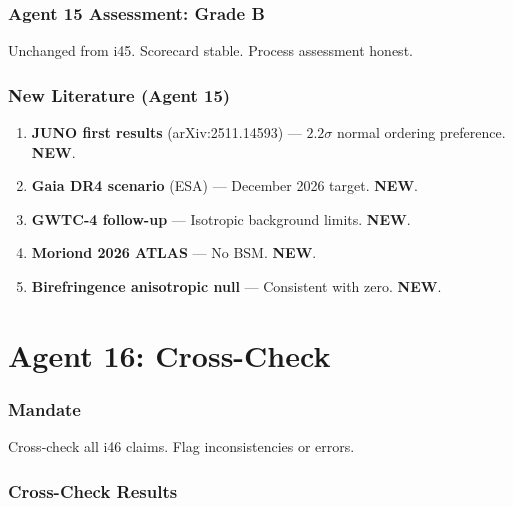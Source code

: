 \documentclass[11pt,a4paper]{article}
\newcommand{\NEW}{\textcolor{dfdblue}{\textbf{NEW}}}
\begin{document}
\section{Agent 15 Assessment: Grade B}

Unchanged from i45. Scorecard stable. Process assessment honest.

\section{New Literature (Agent 15)}

\begin{enumerate}
\item \textbf{JUNO first results} (arXiv:2511.14593) --- $2.2\sigma$ normal ordering preference. \NEW.
\item \textbf{Gaia DR4 scenario} (ESA) --- December 2026 target. \NEW.
\item \textbf{GWTC-4 follow-up} --- Isotropic background limits. \NEW.
\item \textbf{Moriond 2026 ATLAS} --- No BSM. \NEW.
\item \textbf{Birefringence anisotropic null} --- Consistent with zero. \NEW.
\end{enumerate}


\part{Agent 16: Cross-Check}
\label{part:agent16}

\section{Mandate}

Cross-check all i46 claims. Flag inconsistencies or errors.

\section{Cross-Check Results}
\end{document}
